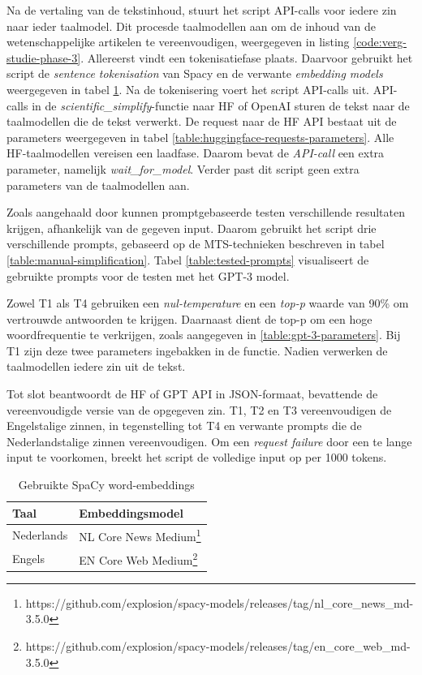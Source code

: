 Na de vertaling van de tekstinhoud, stuurt het script API-calls voor iedere zin naar ieder taalmodel. Dit procesde taalmodellen aan om de inhoud van de wetenschappelijke artikelen te vereenvoudigen, weergegeven in listing \ref{code:verg-studie-phase-3}. Allereerst vindt een tokenisatiefase plaats. Daarvoor gebruikt het script de \textit{sentence tokenisation} van Spacy en de verwante \textit{embedding models} weergegeven in tabel \ref{table:wordembeddings-spacy}. Na de tokenisering voert het script API-calls uit. API-calls in de \textit{scientific\_simplify}-functie naar HF of OpenAI sturen de tekst naar de taalmodellen die de tekst verwerkt. De request naar de HF API bestaat uit de parameters weergegeven in tabel \ref{table:huggingface-requests-parameters}. Alle HF-taalmodellen vereisen een laadfase. Daarom bevat de \textit{API-call} een extra parameter, namelijk \textit{wait\_for\_model}. Verder past dit script geen extra parameters van de taalmodellen aan. 

\medspace

Zoals aangehaald door \textcite{Gooding2022} kunnen promptgebaseerde testen verschillende resultaten krijgen, afhankelijk van de gegeven input. Daarom gebruikt het script drie verschillende prompts, gebaseerd op de MTS-technieken beschreven in tabel \ref{table:manual-simplification}. Tabel \ref{table:tested-prompts} visualiseert de gebruikte prompts voor de testen met het GPT-3 model. 

\medspace

Zowel T1 als T4 gebruiken een \textit{nul-temperature} en een \textit{top-p} waarde van 90\% om vertrouwde antwoorden te krijgen. Daarnaast dient de top-p om een hoge woordfrequentie te verkrijgen, zoals aangegeven in \ref{table:gpt-3-parameters}. Bij T1 zijn deze twee parameters ingebakken in de functie. Nadien verwerken de taalmodellen iedere zin uit de tekst. 

\medspace

Tot slot beantwoordt de HF of GPT API in JSON-formaat, bevattende de vereenvoudigde versie van de opgegeven zin. T1, T2 en T3 vereenvoudigen de Engelstalige zinnen, in tegenstelling tot T4 en verwante prompts die de Nederlandstalige zinnen vereenvoudigen. Om een \textit{request failure} door een te lange input te voorkomen, breekt het script de volledige input op per 1000 tokens.


\begin{center}
	\begin{table}[H]
		\begin{tabular}{ | m{7cm} | m{7cm} | } 
			\hline
			\textbf{Taal} & \textbf{Embeddingsmodel} \\
			\hline
			Nederlands & NL Core News Medium\footnote{https://github.com/explosion/spacy-models/releases/tag/nl_core_news_md-3.5.0} \\ 
			\hline
			Engels & EN Core Web Medium\footnote{https://github.com/explosion/spacy-models/releases/tag/en_core_web_md-3.5.0} \\
			\hline
		\end{tabular}
		\caption{Gebruikte SpaCy word-embeddings}
		\label{table:wordembeddings-spacy}
	\end{table}
\end{center}

